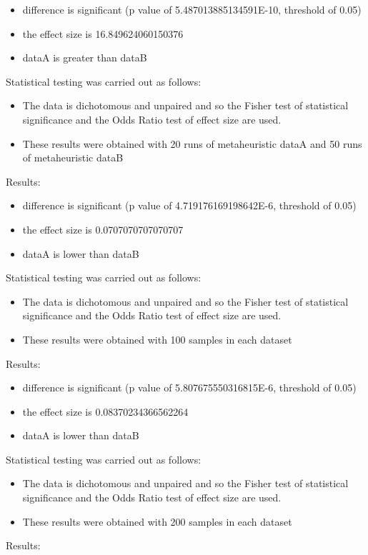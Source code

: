 \documentclass[]{article}
\begin{document}
\begin{itemize}
\item{difference is significant (p value of 5.487013885134591E-10, threshold of 0.05)}
\item{the effect size is 16.849624060150376}
\item{dataA is greater than dataB}
\end{itemize}Statistical testing was carried out as follows: \begin{itemize}
\item{The data is dichotomous and unpaired and so the Fisher test of statistical significance and the Odds Ratio test of effect size are used.}
\item{These results were obtained with 20 runs of metaheuristic dataA and 50 runs of metaheuristic dataB}
\end{itemize}Results:
\begin{itemize}
\item{difference is significant (p value of 4.719176169198642E-6, threshold of 0.05)}
\item{the effect size is 0.0707070707070707}
\item{dataA is lower than dataB}
\end{itemize}Statistical testing was carried out as follows: \begin{itemize}
\item{The data is dichotomous and unpaired and so the Fisher test of statistical significance and the Odds Ratio test of effect size are used.}
\item{These results were obtained with 100 samples in each dataset}
\end{itemize}Results:
\begin{itemize}
\item{difference is significant (p value of 5.807675550316815E-6, threshold of 0.05)}
\item{the effect size is 0.08370234366562264}
\item{dataA is lower than dataB}
\end{itemize}Statistical testing was carried out as follows: \begin{itemize}
\item{The data is dichotomous and unpaired and so the Fisher test of statistical significance and the Odds Ratio test of effect size are used.}
\item{These results were obtained with 200 samples in each dataset}
\end{itemize}Results:
\end{document}
